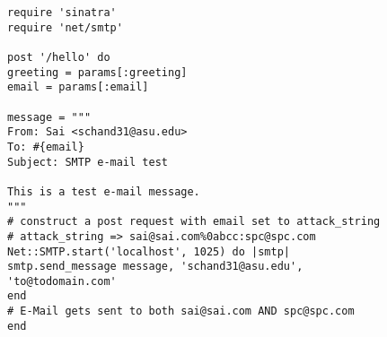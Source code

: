\begin{lstlisting}
require 'sinatra'
require 'net/smtp'

post '/hello' do
greeting = params[:greeting]
email = params[:email]

message = """
From: Sai <schand31@asu.edu>
To: #{email}
Subject: SMTP e-mail test

This is a test e-mail message.
"""
# construct a post request with email set to attack_string
# attack_string => sai@sai.com%0abcc:spc@spc.com
Net::SMTP.start('localhost', 1025) do |smtp|
smtp.send_message message, 'schand31@asu.edu',
'to@todomain.com'
end
# E-Mail gets sent to both sai@sai.com AND spc@spc.com
end
\end{lstlisting}